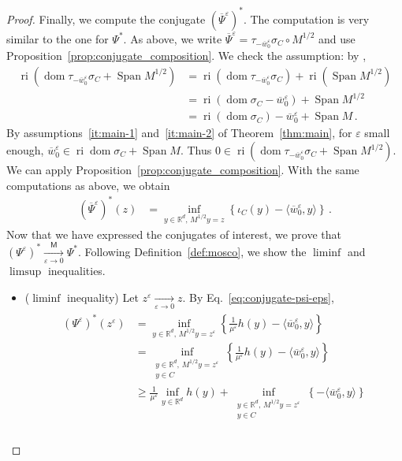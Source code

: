 \documentclass[11pt,english,reqno]{article}
\DeclareMathOperator{\Span}{Span}
\DeclareMathOperator{\dom}{dom}
\DeclareMathOperator{\ri}{ri}
\newcommand{\R}{\mathbb{R}}
\renewcommand{\geq}{\geqslant}
\theoremstyle{plain}
\theoremstyle{definition}
\theoremstyle{remark}
\numberwithin{equation}{section}
\begin{document}
\begin{proof}
Finally, we compute the conjugate $(\overline{\Psi}^\varepsilon)^*$. The computation is very similar to the one for $\Psi^*$. As above, we write $\overline{\Psi}^\varepsilon = \tau_{-\overline{w}_0^\varepsilon}\sigma_C \circ M^{1/2}$ and use Proposition~\ref{prop:conjugate_composition}. We check the assumption: by \cite[Coro.~6.6.2]{rockafellar1970convex}, 
\begin{align*}
	\ri(\dom \tau_{-\overline{w}_0^\varepsilon} \sigma_C + \Span M^{1/2}) &= \ri(\dom \tau_{-\overline{w}_0^\varepsilon} \sigma_C) + \ri(\Span M^{1/2}) \\
	&= \ri(\dom \sigma_C - \overline{w}_0^\varepsilon) + \Span M^{1/2} \\
	&= \ri(\dom \sigma_C) - \overline{w}_0^\varepsilon + \Span M \, .
\end{align*}
By assumptions~\ref{it:main-1} and~\ref{it:main-2} of Theorem~\ref{thm:main}, for $\varepsilon$ small enough, $\overline{w}_0^\varepsilon \in \ri \dom \sigma_C + \Span M$. Thus $0 \in \ri(\dom \tau_{-\overline{w}_0^\varepsilon} \sigma_C + \Span M^{1/2})$. We can apply Proposition~\ref{prop:conjugate_composition}. With the same computations as above, we obtain
\begin{align}
	\label{eq:conjugate-overline-psi-eps}
	(\overline{\Psi}^\varepsilon)^*(z) &= \inf_{y \in \R^d, \,  M^{1/2}y=z} \left\{\iota_{C}(y) - \langle \overline{w}_0^\varepsilon, y \rangle \right\} \, . 
\end{align}
Now that we have expressed the conjugates of interest, we prove that $(\Psi^\varepsilon)^* \xrightarrow[\varepsilon\to 0]{\mathsf{M}} \Psi^*$. Following Definition~\ref{def:mosco}, we show the $\liminf$ and $\limsup$ inequalities.
\begin{itemize}
	\item ($\liminf$ inequality) Let $z^\varepsilon \xrightarrow[\varepsilon\to 0]{} z$. By Eq.~\eqref{eq:conjugate-psi-eps}, 
	\begin{align}
		\label{eq:aux-1}
		\begin{split}
			(\Psi^\varepsilon)^*(z^\varepsilon) 
			&= \inf_{y \in \R^d, \,  M^{1/2}y=z^\varepsilon} \left\{\frac{1}{\mu^\varepsilon}h(y)-\langle \overline{w}_0^\varepsilon, y \rangle\right\} \\
	&= \inf_{\substack{y \in \R^d, \,  M^{1/2}y=z^\varepsilon \\ y \in C}} \left\{\frac{1}{\mu^\varepsilon}h(y)-\langle \overline{w}_0^\varepsilon, y \rangle\right\} \\
	&\geq \frac{1}{\mu^\varepsilon} \inf_{y \in \R^d} h(y) + \inf_{\substack{y \in \R^d, \,  M^{1/2}y=z^\varepsilon \\ y \in C}} \left\{-\langle \overline{w}_0^\varepsilon, y \rangle\right\} \\

\end{split}
\end{align}
\end{itemize}
\end{proof}
\end{document}
